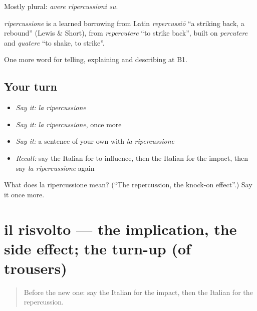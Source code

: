 Mostly plural: \emph{avere ripercussioni su}.

\begin{cousinweb}
\emph{ripercussione} is a learned borrowing from Latin \emph{repercussiō} \textquotedblleft{}a striking back, a rebound\textquotedblright{} (Lewis \& Short), from \emph{repercutere} \textquotedblleft{}to strike back\textquotedblright{}, built on \emph{percutere} and \emph{quatere} \textquotedblleft{}to shake, to strike\textquotedblright{}.
\end{cousinweb}

\begin{grammarlens}[title={What you've built}]
One more word for telling, explaining and describing at B1.
\end{grammarlens}

\subsection*{Your turn}
\begin{itemize}
\raggedright
  \item \emph{Say it:} \emph{la ripercussione}
  \item \emph{Say it:} \emph{la ripercussione}, once more
  \item \emph{Say it:} a sentence of your own with \emph{la ripercussione}
  \item \emph{Recall:} say the Italian for to influence, then the Italian for the impact, then say \emph{la ripercussione} again
\end{itemize}

\begin{tcolorbox}[breakable,colback=teal!4,colframe=teal!35!black,title={Before you move on}]
What does la ripercussione mean? (\textquotedblleft{}The repercussion, the knock-on effect\textquotedblright{}.) Say it once more.
\end{tcolorbox}
\section[il risvolto]{il risvolto — the implication, the side effect; the turn-up (of trousers)}

\label{lesson:IT-C352-risvolto}



\begin{quote}
Before the new one: say the Italian for the impact, then the Italian for the repercussion.
\end{quote}

